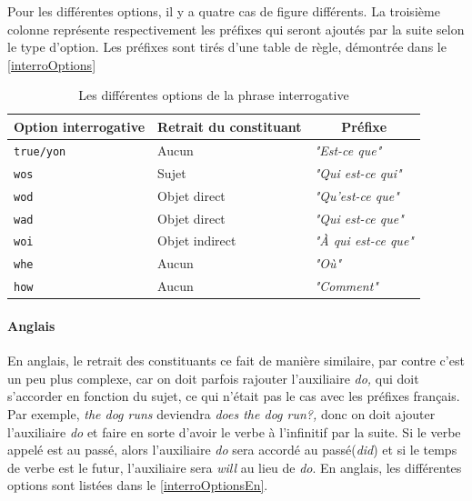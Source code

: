 \documentclass[11pt]{article} %
\newcommand{\real}[1]{\emph{#1}}
\begin{document}
Pour les différentes options, il y a quatre cas de figure différents.
La troisième colonne représente respectivement les préfixes qui seront
ajoutés par la suite selon le type d'option. Les préfixes sont tirés
d'une table de règle, démontrée dans le \autoref{interroOptions} 
\begin{table}[ht]
\centering
\caption{Les différentes options de la phrase interrogative}
\begin{tabular}{|l|l|l|}
\hline 
\multicolumn{1}{|c}{Option interrogative} & \multicolumn{1}{|c}{Retrait du constituant} & \multicolumn{1}{|c|}{Préfixe}\\
\hline 
\hline 
\texttt{true/yon} & Aucun & \real{"Est-ce que"}\\
\hline 
\texttt{wos} & Sujet & \real{"Qui est-ce qui"}\\
\hline 
\texttt{wod} & Objet direct & \real{"Qu'est-ce que"}\\
\hline 
\texttt{wad} & Objet direct & \real{"Qui est-ce que"}\\
\hline 
\texttt{woi} & Objet indirect & \real{"À qui est-ce que"}\\
\hline 
\texttt{whe} & Aucun & \real{"Où"}\\
\hline 
\texttt{how} & Aucun & \real{"Comment"}\\
\hline 
\end{tabular}
\label{interroOptions}
\end{table}


\paragraph{Anglais}

En anglais, le retrait des constituants ce fait de manière similaire,
par contre c'est un peu plus complexe, car on doit parfois rajouter
l'auxiliaire \emph{do, }qui doit s'accorder en fonction du sujet,
ce qui n'était pas le cas avec les préfixes français.\emph{ }Par exemple,
\emph{the dog runs} deviendra \emph{does the dog run?, }donc on doit
ajouter l'auxiliaire \emph{do }et faire en sorte d'avoir le verbe
à l'infinitif par la suite. Si le verbe appelé est au passé, alors
l'auxiliaire \emph{do }sera accordé au passé(\emph{did}) et si le
temps de verbe est le futur, l'auxiliaire sera \emph{will }au lieu
de \emph{do}. En anglais, les différentes options sont listées dans 
le \autoref{interroOptionsEn}.
\end{document}
